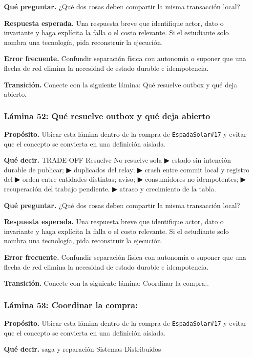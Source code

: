 \documentclass[variant=docente,cover=institutional,mode=screen]{ua-engineering-v6-article}
\begin{document}
\textbf{Qué preguntar.} ¿Qué dos cosas deben compartir la misma transacción local?

\textbf{Respuesta esperada.} Una respuesta breve que identifique actor, dato o invariante y haga explícita la falla o el costo relevante. Si el estudiante solo nombra una tecnología, pida reconstruir la ejecución.

\textbf{Error frecuente.} Confundir separación física con autonomía o suponer que una flecha de red elimina la necesidad de estado durable e idempotencia.

\textbf{Transición.} Conecte con la siguiente lámina: Qué resuelve outbox y qué deja abierto.

\subsubsection*{Lámina 52: Qué resuelve outbox y qué deja abierto}
\textbf{Propósito.} Ubicar esta lámina dentro de la compra de \texttt{EspadaSolar\#17} y evitar que el concepto se convierta en una definición aislada.

\textbf{Qué decir.} TRADE-OFF Resuelve No resuelve sola ▶ estado sin intención durable de publicar; ▶ duplicados del relay; ▶ crash entre commit local y registro del ▶ orden entre entidades distintas; aviso; ▶ consumidores no idempotentes; ▶ recuperación del trabajo pendiente. ▶ atraso y crecimiento de la tabla.

\textbf{Qué preguntar.} ¿Qué dos cosas deben compartir la misma transacción local?

\textbf{Respuesta esperada.} Una respuesta breve que identifique actor, dato o invariante y haga explícita la falla o el costo relevante. Si el estudiante solo nombra una tecnología, pida reconstruir la ejecución.

\textbf{Error frecuente.} Confundir separación física con autonomía o suponer que una flecha de red elimina la necesidad de estado durable e idempotencia.

\textbf{Transición.} Conecte con la siguiente lámina: Coordinar la compra:.

\subsubsection*{Lámina 53: Coordinar la compra:}
\textbf{Propósito.} Ubicar esta lámina dentro de la compra de \texttt{EspadaSolar\#17} y evitar que el concepto se convierta en una definición aislada.

\textbf{Qué decir.} saga y reparación Sistemas Distribuidos
\end{document}
